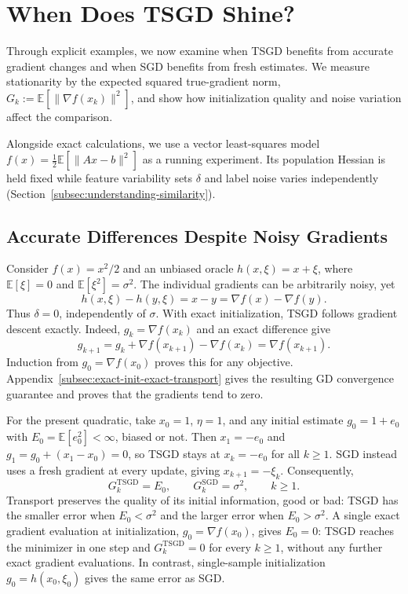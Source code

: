 \section{When Does TSGD Shine?}
\label{sec:when-tsgd-shines}

Through explicit examples, we now examine when TSGD benefits from
accurate gradient changes and when SGD benefits from fresh estimates.
We measure stationarity by the expected squared true-gradient norm,
$G_k:=\mathbb E[\|\nabla f(x_k)\|^2]$, and show how initialization
quality and noise variation affect the comparison.

Alongside exact calculations, we use a vector least-squares model
$f(x)=\tfrac12\mathbb E[\|Ax-b\|^2]$ as a running experiment.
Its population Hessian is held fixed while feature variability sets
$\delta$ and label noise varies independently
(Section~\ref{subsec:understanding-similarity}).

\subsection{Accurate Differences Despite Noisy Gradients}
\label{subsec:additive-noise-comparison}

Consider $f(x)=x^2/2$ and an unbiased oracle $h(x,\xi)=x+\xi$,
where $\mathbb E[\xi]=0$ and $\mathbb E[\xi^2]=\sigma^2$.
The individual gradients can be arbitrarily noisy, yet
\[
h(x,\xi)-h(y,\xi)=x-y=\nabla f(x)-\nabla f(y).
\]
Thus $\delta=0$, independently of $\sigma$. With exact
initialization, TSGD follows gradient descent exactly. Indeed,
$g_k=\nabla f(x_k)$ and an exact difference give
\[
g_{k+1}=g_k+\nabla f(x_{k+1})-\nabla f(x_k)=\nabla f(x_{k+1}).
\]
Induction from $g_0=\nabla f(x_0)$ proves this for any objective.
Appendix~\ref{subsec:exact-init-exact-transport} gives the resulting
GD convergence guarantee and proves that the gradients tend to zero.

For the present quadratic, take $x_0=1$, $\eta=1$, and any initial
estimate $g_0=1+e_0$ with $E_0=\mathbb E[e_0^2]<\infty$, biased or not.
Then $x_1=-e_0$ and $g_1=g_0+(x_1-x_0)=0$, so TSGD stays at
$x_k=-e_0$ for all $k\geq1$. SGD instead uses a fresh gradient at
every update, giving $x_{k+1}=-\xi_k$. Consequently,
\[
\boxed{G_k^{\mathrm{TSGD}}=E_0,\qquad
G_k^{\mathrm{SGD}}=\sigma^2,\qquad k\geq1.}
\]
Transport preserves the quality of its initial information, good or bad:
TSGD has the smaller error when $E_0<\sigma^2$ and the larger error
when $E_0>\sigma^2$. A single exact gradient evaluation at initialization,
$g_0=\nabla f(x_0)$, gives $E_0=0$: TSGD reaches the minimizer in one
step and $G_k^{\mathrm{TSGD}}=0$ for every $k\geq1$, without any further
exact gradient evaluations. In contrast, single-sample initialization
$g_0=h(x_0,\xi_0)$ gives the same error as SGD.

